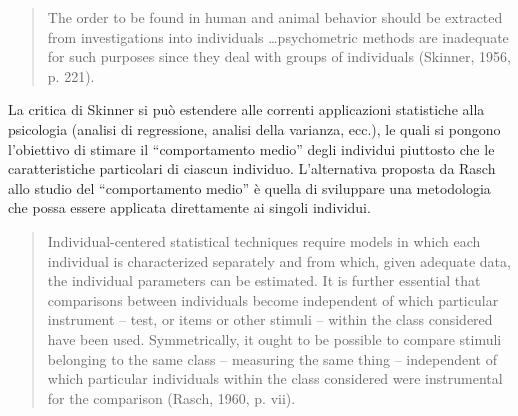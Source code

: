 \begin{quote}
The order to be found in human and animal behavior should be extracted from investigations into individuals \dots psychometric methods are inadequate for such purposes since they deal with groups of individuals (Skinner, 1956, p. 221).
\end{quote}
La critica di Skinner si può estendere alle correnti applicazioni statistiche alla psicologia (analisi di regressione, analisi della varianza, ecc.), le quali si pongono l'obiettivo di stimare il ``comportamento medio'' degli individui piuttosto che le caratteristiche particolari di ciascun individuo.  L'alternativa proposta da Rasch allo studio del ``comportamento medio'' è quella di sviluppare una metodologia che possa essere applicata direttamente ai singoli individui.
\begin{quote}
Individual-centered statistical techniques require models in which each individual is characterized separately and from which, given adequate data, the individual parameters can be estimated. It is further essential that comparisons between individuals become independent of which particular instrument -- test, or items or other stimuli -- within the class considered have been used.  Symmetrically, it ought to be possible to compare stimuli belonging to the same class -- measuring the same thing -- independent of which particular individuals within the class considered were instrumental for the comparison (Rasch, 1960, p. vii).
\end{quote}
%

